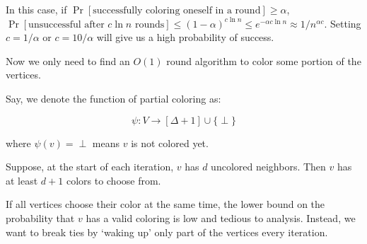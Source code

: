 In this case, if $\Pr[\text{successfully coloring oneself in a round}]\geq \alpha$, $\Pr[\text{unsuccessful after }c\ln n\text{ rounds}]\leq (1-\alpha)^{c\ln n} \leq e^{-\alpha c \ln n} \approx 1/n^{\alpha c}$. Setting $c = 1/\alpha$ or $c = 10/\alpha$ will give us a high probability of success.

Now we only need to find an $O(1)$ round algorithm to color some portion of the vertices.

Say, we denote the function of partial coloring as:

\[ \psi: V \to [\Delta + 1] \cup \{\perp\} \]

where $\psi(v) = \perp$ means $v$ is not colored yet.

Suppose, at the start of each iteration, $v$ has $d$ uncolored neighbors. Then $v$ has at least $d+1$ colors to choose from. 

If all vertices choose their color at the same time, the lower bound on the probability that $v$ has a valid coloring is low and tedious to analysis. Instead, we want to break ties by `waking up' only part of the vertices every iteration.

\begin{algorithm}
  \caption{Randomized $(\Delta + 1)$-Coloring Algorithm} \label{alg:rand-delta-plus-1-coloring}
\end{algorithm}

